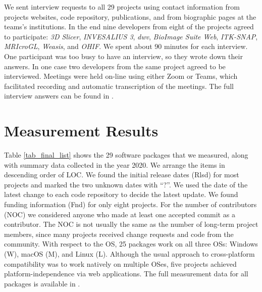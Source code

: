 \documentclass[final, 3p, times, authoryear]{elsarticle}
\begin{document}
We sent interview requests to all 29 projects using contact information from
projects websites, code repository, publications, and from biographic pages at
the teams's institutions.  In the end nine developers from eight of the projects
agreed to participate: \textit{3D Slicer}, \textit{INVESALIUS 3}, \textit{dwv},
\textit{BioImage Suite Web}, \textit{ITK-SNAP}, \textit{MRIcroGL},
\textit{Weasis}, and \textit{OHIF}. We spent about 90 minutes for each
interview. One participant was too busy to have an interview, so they wrote down
their answers. In one case two developers from the same project agreed to be
interviewed. Meetings were held on-line using either Zoom or Teams, which
facilitated recording and automatic transcription of the meetings. The full
interview answers can be found in \citet{Dong2021}.

\section{Measurement Results} \label{ch_results}

Table \ref{tab_final_list} shows the 29 software packages that we measured,
along with summary data collected in the year 2020. We arrange the items in
descending order of LOC. We found the initial release dates (Rlsd) for most
projects and marked the two unknown dates with ``?''. We used the date of the
latest change to each code repository to decide the latest update. We found
funding information (Fnd) for only eight projects.  For the number of
contributors (NOC) we considered anyone who made at least one accepted commit as
a contributor. The NOC is not usually the same as the number of long-term
project members, since many projects received change requests and code from the
community.  With respect to the OS, 25 packages work on all three OSs: Windows
(W), macOS (M), and Linux (L). Although the usual approach to cross-platform
compatibility was to work natively on multiple OSes, five projects achieved
platform-independence via web applications. The full measurement data for all
packages is available in \citet{Dong2021-Data}.
\end{document}
